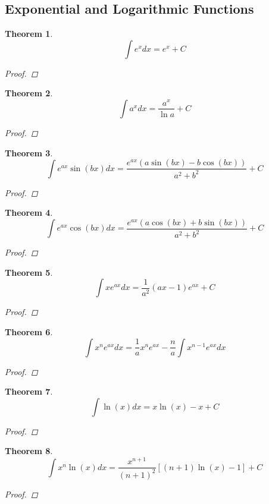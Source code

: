 \documentclass[10pt]{report}
\newtheorem{thm3}{Theorem}[subsection]
\begin{document}
\subsection{Exponential and Logarithmic Functions}
\begin{thm3}
$$\int e^xdx=e^x+C$$
\begin{proof}

\end{proof}
\end{thm3}
\begin{thm3}
$$\int a^x dx=\frac{a^x}{\ln a}+C$$
\begin{proof}

\end{proof}
\end{thm3}
\begin{thm3}
$$\int e^{ax}\sin (bx)dx=\frac{e^{ax}(a\sin(bx)-b\cos(bx))}{a^2+b^2}+C$$
\begin{proof}

\end{proof}
\end{thm3}
\begin{thm3}
$$\int e^{ax}\cos(bx)dx=\frac{e^{ax}(a\cos(bx)+b\sin(bx))}{a^2+b^2}+C$$
\begin{proof}

\end{proof}
\end{thm3}
\begin{thm3}
$$\int xe^{ax}dx=\frac{1}{a^2}(ax-1)e^{ax}+C$$
\begin{proof}

\end{proof}
\end{thm3}
\begin{thm3}
$$\int x^ne^{ax}dx=\frac{1}{a}x^ne^{ax}-\frac{n}{a}\int x^{n-1}e^{ax}dx$$
\begin{proof}

\end{proof}
\end{thm3}
\begin{thm3}
$$\int \ln(x)dx=x\ln(x)-x+C$$
\begin{proof}

\end{proof}
\end{thm3}
\begin{thm3}
$$\int x^n\ln(x)dx=\frac{x^{n+1}}{(n+1)^2}[(n+1)\ln(x)-1]+C$$
\begin{proof}

\end{proof}
\end{thm3}
\end{document}
